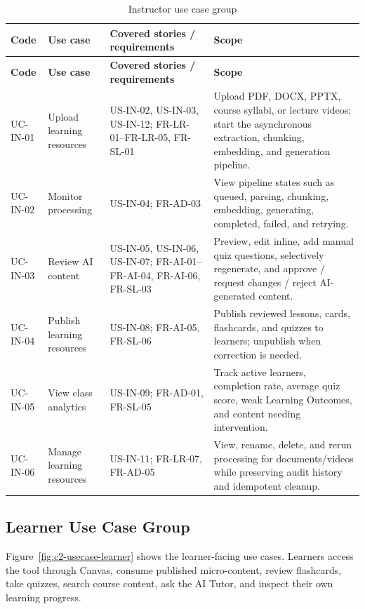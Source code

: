 \begingroup
\scriptsize
\setlength{\tabcolsep}{3pt}
\begin{longtable}{|p{1.8cm}|p{3.4cm}|p{4.0cm}|p{5.2cm}|}
\caption{Instructor use case group}
\label{tab:use-case-giang-vien}\\
\hline
\textbf{Code} & \textbf{Use case} & \textbf{Covered stories / requirements} & \textbf{Scope} \\
\hline
\endfirsthead
\hline
\textbf{Code} & \textbf{Use case} & \textbf{Covered stories / requirements} & \textbf{Scope} \\
\hline
\endhead
UC-IN-01 & Upload learning resources & US-IN-02, US-IN-03, US-IN-12; FR-LR-01--FR-LR-05, FR-SL-01 & Upload PDF, DOCX, PPTX, course syllabi, or lecture videos; start the asynchronous extraction, chunking, embedding, and generation pipeline. \\
\hline
UC-IN-02 & Monitor processing & US-IN-04; FR-AD-03 & View pipeline states such as queued, parsing, chunking, embedding, generating, completed, failed, and retrying. \\
\hline
UC-IN-03 & Review AI content & US-IN-05, US-IN-06, US-IN-07; FR-AI-01--FR-AI-04, FR-AI-06, FR-SL-03 & Preview, edit inline, add manual quiz questions, selectively regenerate, and approve / request changes / reject AI-generated content. \\
\hline
UC-IN-04 & Publish learning resources & US-IN-08; FR-AI-05, FR-SL-06 & Publish reviewed lessons, cards, flashcards, and quizzes to learners; unpublish when correction is needed. \\
\hline
UC-IN-05 & View class analytics & US-IN-09; FR-AD-01, FR-SL-05 & Track active learners, completion rate, average quiz score, weak Learning Outcomes, and content needing intervention. \\
\hline
UC-IN-06 & Manage learning resources & US-IN-11; FR-LR-07, FR-AD-05 & View, rename, delete, and rerun processing for documents/videos while preserving audit history and idempotent cleanup. \\
\hline
\end{longtable}
\endgroup

\subsection{Learner Use Case Group}
\label{subsec:use-case-hoc-vien}

Figure~\ref{fig:c2-usecase-learner} shows the learner-facing use cases.
Learners access the tool through Canvas, consume published micro-content,
review flashcards, take quizzes, search course content, ask the AI Tutor,
and inspect their own learning progress.


